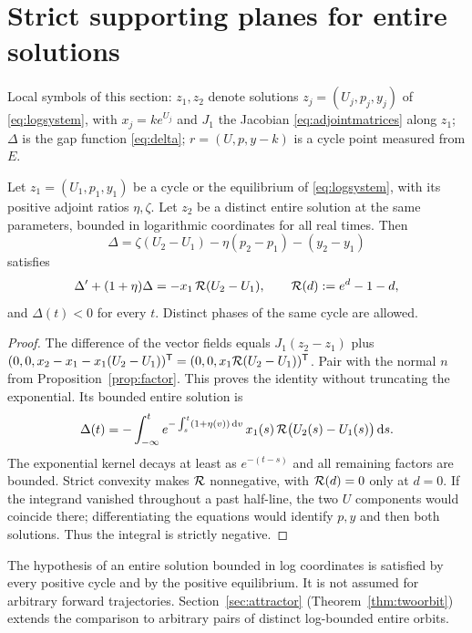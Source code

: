 \section{Strict supporting planes for entire solutions}\label{sec:support}
Local symbols of this section: $z_1,z_2$ denote solutions $z_j=(U_j,p_j,y_j)$ of \eqref{eq:logsystem}, with $x_j=ke^{U_j}$ and $J_1$ the Jacobian \eqref{eq:adjointmatrices} along $z_1$; $\Delta$ is the gap function \eqref{eq:delta}; $r=(U,p,y-k)$ is a cycle point measured from $E$.

\begin{theorem}\label{thm:support}
Let $z_1=(U_1,p_1,y_1)$ be a cycle or the equilibrium of \eqref{eq:logsystem}, with its positive adjoint ratios $\eta,\zeta$. Let $z_2$ be a distinct entire solution at the same parameters, bounded in logarithmic coordinates for all real times. Then
\begin{equation}\label{eq:delta}
\Delta=\zeta(U_2-U_1)-\eta(p_2-p_1)-(y_2-y_1)
\end{equation}
satisfies
\begin{equation}\label{eq:supportidentity}
\Delta'+(1+\eta)\Delta=-x_1\,\mathcal R(U_2-U_1),\qquad \mathcal R(d):=e^d-1-d,
\end{equation}
and $\Delta(t)<0$ for every $t$. Distinct phases of the same cycle are allowed.
\end{theorem}
\begin{proof}
The difference of the vector fields equals $J_1(z_2-z_1)$ plus
$(0,0,x_2-x_1-x_1(U_2-U_1))^{\mathsf T}=(0,0,x_1\mathcal R(U_2-U_1))^{\mathsf T}$. Pair with the normal $n$ from Proposition~\ref{prop:factor}. This proves the identity without truncating the exponential. Its bounded entire solution is
\[
\Delta(t)=-\int_{-\infty}^t
 e^{-\int_s^t(1+\eta(v))\,\mathrm dv}\,
 x_1(s)\,\mathcal R\bigl(U_2(s)-U_1(s)\bigr)\,\mathrm ds.
\]
The exponential kernel decays at least as $e^{-(t-s)}$ and all remaining factors are bounded. Strict convexity makes $\mathcal R$ nonnegative, with $\mathcal R(d)=0$ only at $d=0$. If the integrand vanished throughout a past half-line, the two $U$ components would coincide there; differentiating the equations would identify $p,y$ and then both solutions. Thus the integral is strictly negative.
\end{proof}
The hypothesis of an entire solution bounded in log coordinates is satisfied by every positive cycle and by the positive equilibrium. It is not assumed for arbitrary forward trajectories. Section~\ref{sec:attractor} (Theorem~\ref{thm:twoorbit}) extends the comparison to arbitrary pairs of distinct log-bounded entire orbits.


